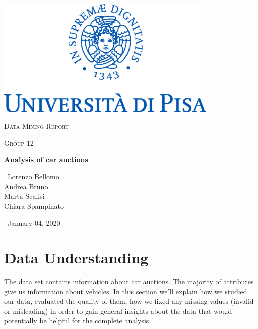 \documentclass{article}
\begin{document}
	
	\begin{titlepage}
		\centering
		\includegraphics[width=0.80\textwidth]{marchio.jpg}\par\vspace{2cm}
		{\scshape\LARGE Data Mining Report \par}
		\vspace{1cm}
		{\scshape\Large Group 12 \\ \par}
		\vspace{1cm}
		{\huge\bfseries Analysis of car auctions\par}
		\vspace{2cm}
		{\Large\ Lorenzo Bellomo \\ Andrea Bruno \\ Marta Scalisi \\ Chiara Spampinato\par}
		\vspace{4cm}
		{\Large\ January 04, 2020\par}
	\end{titlepage}
	
	
	
	
	\section{Data Understanding}
	The data set contains information about car auctions. The majority of attributes give us information about vehicles. 
	In this section we'll explain how we studied our data, evaluated the quality of them, how we fixed any missing values (invalid or misleading) in order to gain general insights about the data that would potentially be helpful for the complete analysis.
	
\end{document}
